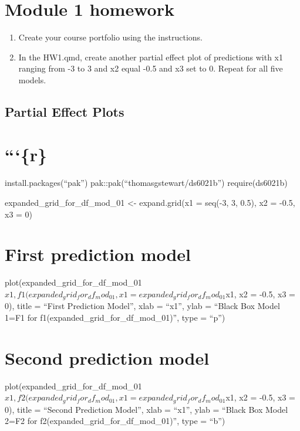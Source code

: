 \documentclass[
  letterpaper,
  DIV=11,
  numbers=noendperiod]{scrreprt}
\begin{document}
\chapter{Module 1 homework}\label{module-1-homework}

\begin{enumerate}
\def\labelenumi{\arabic{enumi}.}
\item
  Create your course portfolio using the instructions.
\item
  In the HW1.qmd, create another partial effect plot of predictions with
  x1 ranging from -3 to 3 and x2 equal -0.5 and x3 set to 0. Repeat for
  all five models.
\end{enumerate}

\section{Partial Effect Plots}\label{partial-effect-plots}


\chapter{```\{r\}}\label{r}

install.packages(``pak'') pak::pak(``thomasgstewart/ds6021b'')
require(ds6021b)

expanded\_grid\_for\_df\_mod\_01 \textless- expand.grid(x1 = seq(-3, 3,
0.5), x2 = -0.5, x3 = 0)


\chapter{First prediction model}\label{first-prediction-model}

plot(expanded\_grid\_for\_df\_mod\_01\(x1, f1(expanded_grid_for_df_mod_01, x1 = expanded_grid_for_df_mod_01\)x1,
x2 = -0.5, x3 = 0), title = ``First Prediction Model'', xlab = ``x1'',
ylab = ``Black Box Model 1=F1 for
f1(expanded\_grid\_for\_df\_mod\_01)'', type = ``p'')


\chapter{Second prediction model}\label{second-prediction-model}

plot(expanded\_grid\_for\_df\_mod\_01\(x1, f2(expanded_grid_for_df_mod_01, x1 = expanded_grid_for_df_mod_01\)x1,
x2 = -0.5, x3 = 0), title = ``Second Prediction Model'', xlab = ``x1'',
ylab = ``Black Box Model 2=F2 for
f2(expanded\_grid\_for\_df\_mod\_01)'', type = ``b'')
\end{document}
